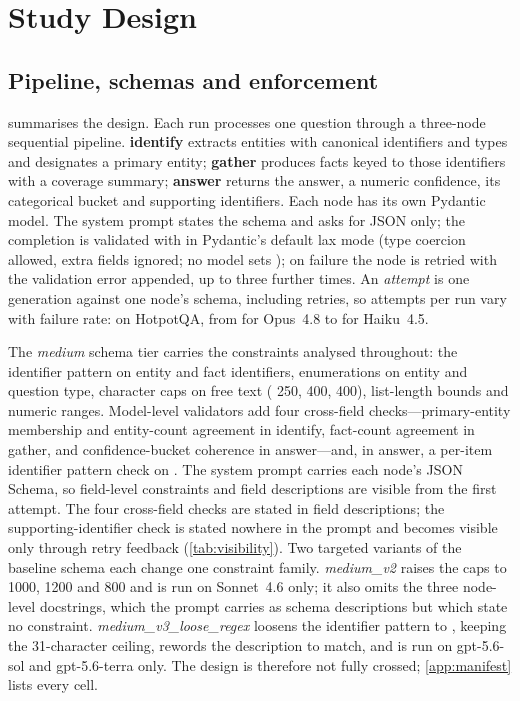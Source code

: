 \section{Study Design}
\label{sec:setup}

\subsection{Pipeline, schemas and enforcement}
\label{sec:setup:pipeline}

 summarises the design. Each run processes one
question through a three-node sequential pipeline.
\textbf{identify} extracts entities with canonical identifiers and types
and designates a primary entity; \textbf{gather} produces facts keyed to
those identifiers with a coverage summary; \textbf{answer} returns the
answer, a numeric confidence, its categorical bucket and supporting
identifiers. Each node has its own Pydantic model. The system prompt
states the schema and asks for JSON only; the completion is validated
with  in Pydantic's default lax mode (type
coercion allowed, extra fields ignored; no model sets
); on failure the node is retried with the
validation error appended, up to three further times. An \emph{attempt} is
one generation against one node's schema, including retries, so attempts
per run vary with failure rate: on HotpotQA, from
 for Opus~4.8 to
 for Haiku~4.5.

The \emph{medium} schema tier carries the constraints analysed
throughout: the identifier pattern \idpattern{} on entity and fact
identifiers, enumerations on entity and question type, character caps
on free text ( 250,  400, 
400), list-length bounds and numeric ranges. Model-level validators add
four cross-field checks---primary-entity membership and entity-count
agreement in identify, fact-count agreement in gather, and
confidence-bucket coherence in answer---and, in answer, a per-item
identifier pattern check on . The system
prompt carries each node's JSON Schema, so field-level constraints and
field descriptions are visible from the first attempt. The four
cross-field checks are stated in field descriptions; the
supporting-identifier check is stated nowhere in the prompt and becomes
visible only through retry feedback (\cref{tab:visibility}).
Two targeted variants of the baseline schema each change one constraint
family. \emph{medium\_v2} raises the caps to 1000, 1200 and 800 and is
run on Sonnet~4.6 only; it also omits the three node-level docstrings,
which the prompt carries as schema descriptions but which state no
constraint. \emph{medium\_v3\_loose\_regex} loosens the identifier
pattern to \idpatternloose{}, keeping the 31-character ceiling, rewords
the  description to match, and is run on
gpt-5.6-sol and gpt-5.6-terra only. The design is therefore not fully
crossed; \cref{app:manifest} lists every cell.

